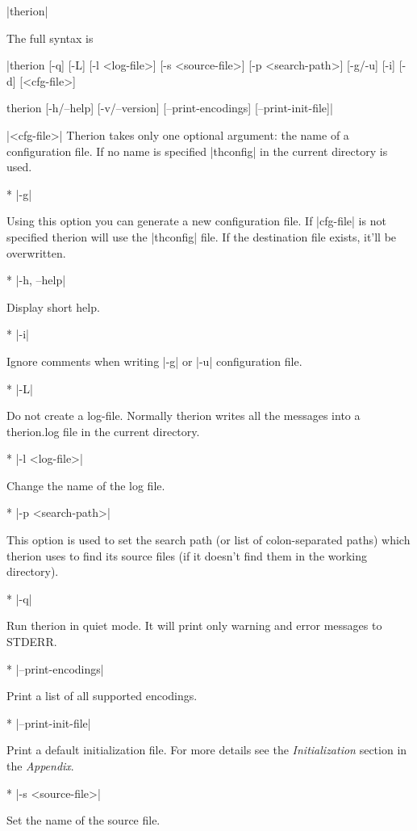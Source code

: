 |therion|

The full syntax is

|therion [-q] [-L] [-l <log-file>]
        [-s <source-file>] [-p <search-path>]
        [-g/-u] [-i] [-d] [<cfg-file>]

therion [-h/--help]
        [-v/--version]
        [--print-encodings]
        [--print-init-file]|

\arguments
  |<cfg-file>| 
  Therion takes only one optional argument: the name of a configuration
  file. If no name is specified |thconfig| in the current directory is used. 
\endarguments

\options
* |-g|

        Using this option you can generate a new configuration file.
        If |cfg-file| is not specified therion will use the |thconfig|
        file. If the destination file exists, it'll be overwritten.
        
* |-h, --help|

        Display short help.

* |-i|

        Ignore comments when writing |-g| or |-u| configuration file.

* |-L|

        Do not create a log-file. Normally therion writes all the messages
        into a therion.log file in the current directory.
        
* |-l <log-file>|

        Change the name of the log file.
        
* |-p <search-path>|

        This option is used to set the search path (or list of 
	colon-separated paths) which therion uses to find its source
        files (if it doesn't find them in the working directory).

* |-q|

        Run therion in quiet mode. It will print only warning
        and error messages to STDERR.

* |--print-encodings|

        Print a list of all supported encodings.
        
* |--print-init-file|

        Print a default initialization file. For more details
        see the {\it Initialization} section in the {\it Appendix}.
        
* |-s <source-file>|

        Set the name of the source file.
        

